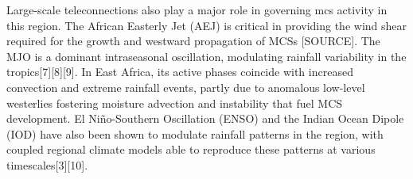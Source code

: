 Large-scale \glspl{teleconnection} also play a major role in governing \acrshort{mcs} activity in this region. The African Easterly Jet (AEJ) is critical in providing the wind shear required for the growth and westward propagation of MCSs [SOURCE]. The MJO is a dominant intraseasonal oscillation, modulating rainfall variability in the tropics[7][8][9]. In East Africa, its active phases coincide with increased convection and extreme rainfall events, partly due to anomalous low-level westerlies fostering moisture advection and instability that fuel MCS development. El Niño-Southern Oscillation (ENSO) and the Indian Ocean Dipole (IOD) have also been shown to modulate rainfall patterns in the region, with coupled regional climate models able to reproduce these patterns at various timescales[3][10].

